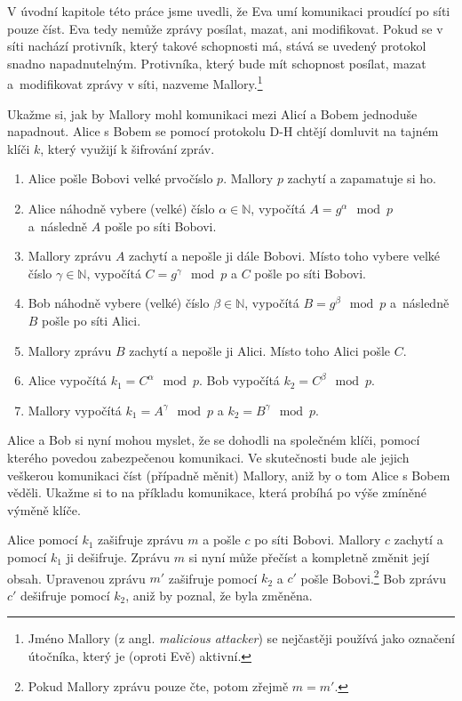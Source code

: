 \documentclass[
  program=infoi,
  biblatex=false,
  figures=true,
  glossaries,
  tables=false,
  sourcecodes=true,
  index
]{kidiplom}
\begin{document}
    V úvodní kapitole této práce jsme uvedli, že Eva umí komunikaci proudící po síti pouze číst.
    Eva tedy nemůže zprávy posílat, mazat, ani modifikovat.
    Pokud se v síti nachází protivník, který takové schopnosti má, stává se uvedený protokol snadno napadnutelným.
    Protivníka, který bude mít schopnost posílat, mazat a~modifikovat zprávy v síti, nazveme Mallory.\footnote{Jméno Mallory
    (z angl. \emph{malicious attacker}) se nejčastěji používá jako označení útočníka, který je (oproti Evě) aktivní.}

    Ukažme si, jak by Mallory mohl komunikaci mezi Alicí a Bobem jednoduše napadnout.
    Alice s Bobem se pomocí protokolu D-H chtějí domluvit na tajném klíči $k$, který využijí k šifrování zpráv.

    \begin{enumerate}
        \item
            Alice pošle Bobovi velké prvočíslo $p$.
            Mallory $p$ zachytí a zapamatuje si ho.
        \item
            Alice náhodně vybere (velké) číslo $\alpha \in \mathbb{N}$, vypočítá $A=g^\alpha \mod{p}$ a~následně $A$ pošle po síti Bobovi.
        \item
            Mallory zprávu $A$ zachytí a nepošle ji dále Bobovi. Místo toho vybere velké číslo $\gamma \in \mathbb{N}$,
            vypočítá $C=g^\gamma \mod{p}$ a $C$ pošle po síti Bobovi.
        \item
            Bob náhodně vybere (velké) číslo $\beta \in \mathbb{N}$, vypočítá $B=g^\beta \mod{p}$ a~následně $B$ pošle po síti Alici.
        \item
            Mallory zprávu $B$ zachytí a nepošle ji Alici. Místo toho Alici pošle $C$.
        \item
            Alice vypočítá $k_1=C^\alpha \mod{p}$. Bob vypočítá $k_2=C^\beta \mod{p}$.
        \item
            Mallory vypočítá $k_1=A^\gamma \mod{p}$ a $k_2=B^\gamma \mod{p}$.

    \end{enumerate}

    Alice a Bob si nyní mohou myslet, že se dohodli na společném klíči, pomocí kterého povedou zabezpečenou komunikaci.
    Ve skutečnosti bude ale jejich veškerou komunikaci číst (případně měnit) Mallory, aniž by o tom Alice s Bobem věděli.
    Ukažme si to na příkladu komunikace, která probíhá po výše zmíněné výměně klíče.

    \begin{example}
        Alice pomocí $k_1$ zašifruje zprávu $m$ a pošle $c$ po síti Bobovi.
        Mallory $c$ zachytí a pomocí $k_1$ ji dešifruje.
        Zprávu $m$ si nyní může přečíst a kompletně změnit její obsah.
        Upravenou zprávu $m'$ zašifruje pomocí $k_2$ a $c'$ pošle Bobovi.\footnote{Pokud Mallory zprávu pouze čte, potom zřejmě $m = m'$.}
        Bob zprávu $c'$ dešifruje pomocí $k_2$, aniž by poznal, že byla změněna.
    \end{example}
    
\end{document}
